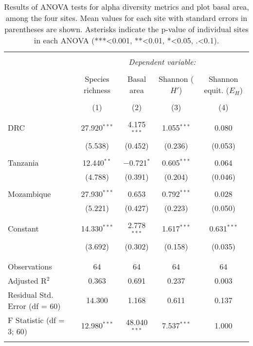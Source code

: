 
\begin{table}[!htbp] \centering 
  \caption{Results of ANOVA tests for alpha diversity metrics and plot basal area, among the four sites. Mean values for each site with standard errors in parentheses are shown. Asterisks indicate the p-value of individual sites in each ANOVA (***<0.001, **<0.01, *<0.05, .<0.1).} 
  \label{bicuar:anova_table} 
\begin{tabular}{@{\extracolsep{0pt}}lcccc} 
\\[-1.8ex]\hline 
\hline \\[-1.8ex] 
 & \multicolumn{4}{c}{\textit{Dependent variable:}} \\ 
\cline{2-5} 
\\[-1.8ex] & Species richness & Basal area & Shannon ($H'$) & Shannon equit. ($E_{H}$) \\ 
\\[-1.8ex] & (1) & (2) & (3) & (4)\\ 
\hline \\[-1.8ex] 
 DRC & 27.920$^{***}$ & 4.175$^{***}$ & 1.055$^{***}$ & 0.080 \\ 
  & (5.538) & (0.452) & (0.236) & (0.053) \\ 
  & & & & \\ 
 Tanzania & 12.440$^{**}$ & $-$0.721$^{*}$ & 0.605$^{***}$ & 0.064 \\ 
  & (4.788) & (0.391) & (0.204) & (0.046) \\ 
  & & & & \\ 
 Mozambique & 27.930$^{***}$ & 0.653 & 0.792$^{***}$ & 0.028 \\ 
  & (5.221) & (0.427) & (0.223) & (0.050) \\ 
  & & & & \\ 
 Constant & 14.330$^{***}$ & 2.778$^{***}$ & 1.617$^{***}$ & 0.631$^{***}$ \\ 
  & (3.692) & (0.302) & (0.158) & (0.035) \\ 
  & & & & \\ 
\hline \\[-1.8ex] 
Observations & 64 & 64 & 64 & 64 \\ 
Adjusted R$^{2}$ & 0.363 & 0.691 & 0.237 & 0.003 \\ 
Residual Std. Error (df = 60) & 14.300 & 1.168 & 0.611 & 0.137 \\ 
F Statistic (df = 3; 60) & 12.980$^{***}$ & 48.040$^{***}$ & 7.537$^{***}$ & 1.000 \\ 
\hline 
\hline \\[-1.8ex] 
\end{tabular} 
\end{table} 
